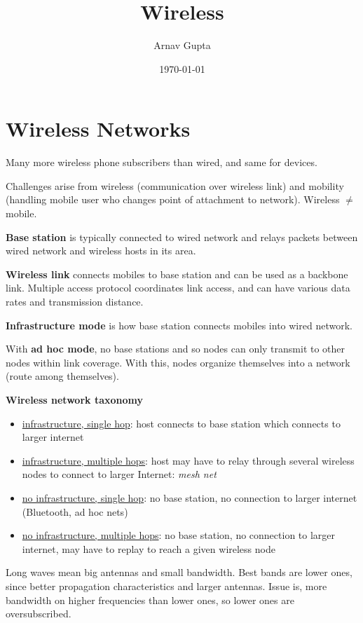 \documentclass[11pt]{article}
\author{Arnav Gupta}
\date{\today}
\title{Wireless}
\begin{document}
\maketitle
\tableofcontents

\section{Wireless Networks}
\label{sec:org6b5e385}
Many more wireless phone subscribers than wired, and same for devices.

Challenges arise from wireless (communication over wireless link) and mobility (handling mobile user
who changes point of attachment to network).
Wireless \(\ne\) mobile.

\textbf{Base station} is typically connected to wired network and relays packets between wired network and
wireless hosts in its area.

\textbf{Wireless link} connects mobiles to base station and can be used as a backbone link. Multiple access
protocol coordinates link access, and can have various data rates and transmission distance.

\textbf{Infrastructure mode} is how base station connects mobiles into wired network.

With \textbf{ad hoc mode}, no base stations and so nodes can only transmit to other nodes within link
coverage. With this, nodes organize themselves into a network (route among themselves).

\textbf{Wireless network taxonomy}
\begin{itemize}
\item \uline{infrastructure, single hop}: host connects to base station which connects to larger internet
\item \uline{infrastructure, multiple hops}: host may have to relay through several wireless nodes to connect
to larger Internet: \emph{mesh net}
\item \uline{no infrastructure, single hop}: no base station, no connection to larger internet (Bluetooth,
ad hoc nets)
\item \uline{no infrastructure, multiple hops}: no base station, no connection to larger internet, may have to
replay to reach a given wireless node
\end{itemize}

Long waves mean big antennas and small bandwidth.
Best bands are lower ones, since better propagation characteristics and larger antennas.
Issue is, more bandwidth on higher frequencies than lower ones, so lower ones are oversubscribed.
\end{document}
